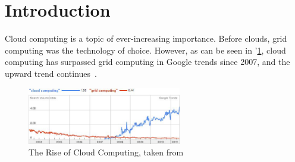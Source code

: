\documentclass[a4paper]{llncs}
\begin{document}
\section{Introduction}
Cloud computing is a topic of ever-increasing importance. Before clouds, grid computing was the technology of choice. However, as can be seen in '\ref{fig:rise_cloud}, cloud computing has surpassed grid computing in Google trends since 2007, and the upward trend continues~\cite{Alhamad11}.

\begin{figure}[Ht]
	\centering
		\includegraphics[width=0.6\textwidth]{figs/rise_cloud.png}
	\caption{The Rise of Cloud Computing, taken from~\cite{Alhamad11}}
	\label{fig:rise_cloud}
\end{figure}
\end{document}
